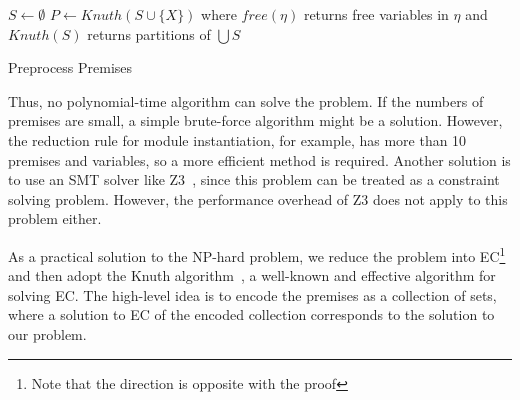 \begin{algorithm}[t]
\DontPrintSemicolon
{}
$S \gets \emptyset$\;
$P \gets \mathit{Knuth}(S \cup \{X\})$\;
where $\mathit{free}(\eta)$ returns free variables in $\eta$ and
$\mathit{Knuth}(S)$ returns partitions of $\bigcup S$
\caption{Preprocess Premises}
\label{algo:preminfer}
\end{algorithm}

\medskip
Thus, no polynomial-time algorithm can solve the problem.
If the numbers of premises are small, a simple brute-force algorithm might be a solution.
However, the reduction rule for module instantiation, for example,
has more than 10 premises and variables, so a more efficient method is required.
Another solution is to use an SMT solver like Z3~\cite{z3},
since this problem can be treated as a constraint solving problem.
However, the performance overhead of Z3 does not apply to this problem either.

As a practical solution to the NP-hard problem,
we reduce the problem into EC\footnote{Note that the direction is opposite with
the proof} and then adopt the Knuth algorithm~\cite{knuth2000dancing},
a well-known and effective algorithm for solving EC.
The high-level idea is to encode the premises as a collection of sets,
where a solution to EC of the encoded collection corresponds to the solution to our problem.

